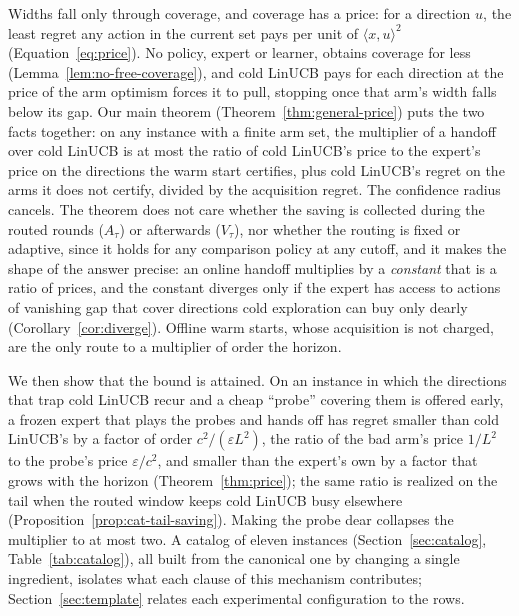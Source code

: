 \documentclass{article}
\theoremstyle{definition}
\theoremstyle{remark}
\newcommand{\eps}{\varepsilon}
\theoremstyle{remark}
\begin{document}
Widths fall only through coverage, and coverage has a price: for a direction
$u$, the least regret any action in the current set pays per unit of
$\langle x,u\rangle^2$ (Equation~\eqref{eq:price}). No policy, expert or
learner, obtains coverage for less (Lemma~\ref{lem:no-free-coverage}), and
cold LinUCB pays for each direction at the price of the arm optimism forces it
to pull, stopping once that arm's width falls below its gap. Our main theorem
(Theorem~\ref{thm:general-price}) puts the two facts together: on any
instance with a finite arm set, the multiplier of a handoff over cold LinUCB
is at most the ratio of cold LinUCB's price to the expert's price on the
directions the warm start certifies, plus cold LinUCB's regret on the arms
it does not certify, divided by the acquisition regret. The confidence radius
cancels. The theorem does not care whether the saving is collected during
the routed rounds ($A_\tau$) or afterwards ($V_\tau$), nor whether the
routing is fixed or adaptive, since it holds for any comparison policy at
any cutoff, and it makes the shape of the answer precise: an online handoff multiplies by a
\emph{constant} that is a ratio of prices, and the constant diverges only
if the expert has access to actions of vanishing gap that cover directions
cold exploration can buy only dearly (Corollary~\ref{cor:diverge}). Offline
warm starts, whose acquisition is not charged, are the only route to a
multiplier of order the horizon.

We then show that the bound is attained. On an instance in which the
directions that trap cold LinUCB recur and a cheap ``probe'' covering them is
offered early, a frozen expert that plays the probes and hands off has regret
smaller than cold LinUCB's by a factor of order $c^2/(\eps L^2)$, the ratio of
the bad arm's price $1/L^2$ to the probe's price $\eps/c^2$, and smaller than
the expert's own by a factor that grows with the horizon
(Theorem~\ref{thm:price}); the same ratio is realized on the tail when the
routed window keeps cold LinUCB busy elsewhere
(Proposition~\ref{prop:cat-tail-saving}). Making the probe dear collapses the
multiplier to at most two. A catalog of eleven instances
(Section~\ref{sec:catalog}, Table~\ref{tab:catalog}), all built from the
canonical one by changing a single ingredient, isolates what each clause of
this mechanism contributes; Section~\ref{sec:template} relates each
experimental configuration to the rows.
\end{document}
